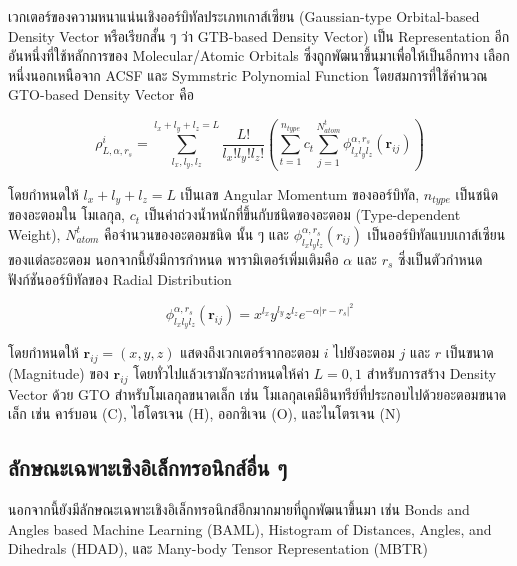 เวกเตอร์ของความหนาแน่นเชิงออร์บิทัลประเภทเกาส์เซียน (Gaussian-type Orbital-based Density Vector หรือเรียกสั้น ๆ ว่า GTB-based 
Density Vector) เป็น Representation อีกอันหนึ่งที่ใช้หลักการของ Molecular/Atomic Orbitals ซึ่งถูกพัฒนาขึ้นมาเพื่อให้เป็นอีกทาง%
เลือกหนึ่งนอกเหนือจาก ACSF และ Symmstric Polynomial Function\autocite{kwac2021} โดยสมการที่ใช้คำนวณ GTO-based Density 
Vector คือ

\begin{equation}
    \rho^{i}_{L,\alpha,r_{s}} = \sum^{l_{x}+l_{y}+l_{z} = L}_{l_{x},l_{y},l_{z}} 
    \frac{L!}{l_{x}!l_{y}!l_{z}!} \left ( \sum^{n_{type}}_{t=1} c_{t} \sum^{N^{t}_{atom}}_{j=1} 
    \phi^{\alpha,r_{s}}_{l_{x}l_{y}l_{z}} (\bm{r}_{ij}) \right )
\end{equation}

\noindent โดยกำหนดให้ $l_{x}+l_{y}+l_{z} = L$ เป็นเลข Angular Momentum ของออร์บิทัล, $n_{type}$ เป็นชนิดของอะตอมใน%
โมเลกุล, $c_{t}$ เป็นค่าถ่วงน้ำหนักที่ขึ้นกับชนิดของอะตอม (Type-dependent Weight), $N^{t}_{atom}$ คือจำนวนของอะตอมชนิด%
นั้น ๆ และ $\phi^{\alpha,r_{s}}_{l_{x}l_{y}l_{z}} (r_{ij})$ เป็นออร์บิทัลแบบเกาส์เซียนของแต่ละอะตอม นอกจากนี้ยังมีการกำหนด%
พารามิเตอร์เพิ่มเติมคือ $\alpha$ และ $r_{s}$ ซึ่งเป็นตัวกำหนดฟังก์ชันออร์บิทัลของ Radial Distribution

\begin{equation}
    \phi^{\alpha,r_{s}}_{l_{x}l_{y}l_{z}} (\bm{r}_{ij}) = x^{l_{x}}y^{l_{y}}z^{l_{z}} e^{-\alpha 
    |r-r_{s}|^{2}}
\end{equation}

\noindent โดยกำหนดให้ $\bm{r}_{ij} = (x,y,z)$ แสดงถึงเวกเตอร์จากอะตอม $i$ ไปยังอะตอม $j$ และ $r$ 
เป็นขนาด (Magnitude) ของ $\bm{r}_{ij}$ โดยทั่วไปแล้วเรามักจะกำหนดให้ค่า $L=0,1$ สำหรับการสร้าง Density Vector 
ด้วย GTO สำหรับโมเลกุลขนาดเล็ก เช่น โมเลกุลเคมีอินทรีย์ที่ประกอบไปด้วยอะตอมขนาดเล็ก เช่น คาร์บอน (C), ไฮโดรเจน (H), ออกซิเจน 
(O), และไนโตรเจน (N)\autocite{kwac2021}

\subsection{ลักษณะเฉพาะเชิงอิเล็กทรอนิกส์อื่น ๆ}
\label{ssec:other_feat_elec}

นอกจากนี้ยังมีลักษณะเฉพาะเชิงอิเล็กทรอนิกส์อีกมากมายที่ถูกพัฒนาขึ้นมา\autocite{faber2018} เช่น Bonds and Angles based Machine 
Learning (BAML)\autocite{huang2016}, Histogram of Distances, Angles, and Dihedrals (HDAD)\autocite{faber2017}, 
และ Many-body Tensor Representation (MBTR)\autocite{huo2018,langer2022}
